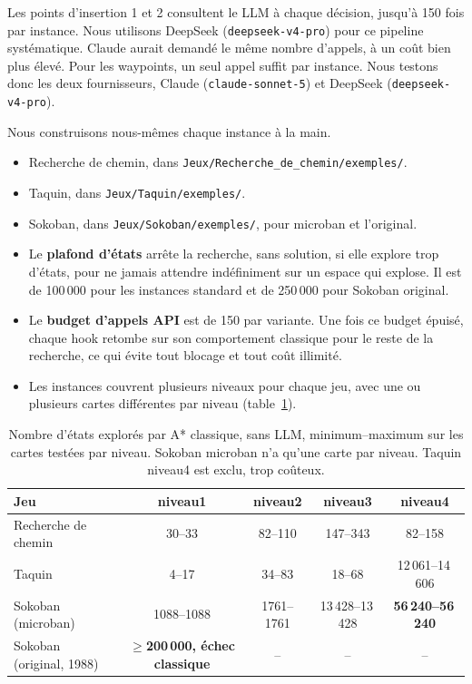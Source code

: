 \documentclass[11pt,a4paper]{article}
\begin{document}
Les points d'insertion 1 et 2 consultent le LLM à chaque décision,
jusqu'à 150 fois par instance. Nous utilisons DeepSeek
(\texttt{deepseek-v4-pro}) pour ce pipeline systématique. Claude aurait
demandé le même nombre d'appels, à un coût bien plus élevé. Pour les
waypoints, un seul appel suffit par instance. Nous testons donc les
deux fournisseurs, Claude (\texttt{claude-sonnet-5}) et DeepSeek
(\texttt{deepseek-v4-pro}).

Nous construisons nous-mêmes chaque instance à la main.
\begin{itemize}
    \item Recherche de chemin, dans \texttt{Jeux/Recherche\_de\_chemin/exemples/}.
    \item Taquin, dans \texttt{Jeux/Taquin/exemples/}.
    \item Sokoban, dans \texttt{Jeux/Sokoban/exemples/}, pour microban et l'original.
\end{itemize}

\begin{itemize}
    \item Le \textbf{plafond d'états} arrête la recherche, sans solution, si
    elle explore trop d'états, pour ne jamais attendre indéfiniment sur un
    espace qui explose. Il est de 100\,000 pour les instances standard et
    de 250\,000 pour Sokoban original.
    \item Le \textbf{budget d'appels API} est de 150 par variante. Une fois ce
    budget épuisé, chaque hook retombe sur son comportement classique
    pour le reste de la recherche, ce qui évite tout blocage et tout coût
    illimité.
    \item Les instances couvrent plusieurs niveaux pour chaque jeu, avec
    une ou plusieurs cartes différentes par niveau (table~\ref{tab:sweep}).
\end{itemize}

\begin{table}[H]
\centering
\small
\begin{tabular}{@{}lcccc@{}}
\toprule
Jeu & niveau1 & niveau2 & niveau3 & niveau4 \\
\midrule
Recherche de chemin & 30--33 & 82--110 & 147--343 & 82--158 \\
Taquin & 4--17 & 34--83 & 18--68 & 12\,061--14\,606 \\
Sokoban (microban) & 1088--1088 & 1761--1761 & 13\,428--13\,428 & \textbf{56\,240--56\,240} \\
Sokoban (original, 1988) & \textbf{$\ge$200\,000, échec classique} & -- & -- & -- \\
\bottomrule
\end{tabular}
\caption{Nombre d'états explorés par A* classique, sans LLM,
minimum--maximum sur les cartes testées par niveau. Sokoban microban n'a qu'une carte par niveau. Taquin niveau4 est exclu, trop coûteux.}
\label{tab:sweep}
\end{table}
\end{document}
